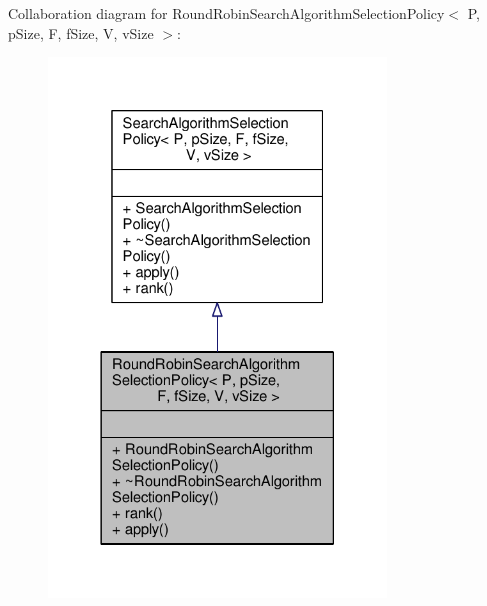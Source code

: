 Collaboration diagram for Round\+Robin\+Search\+Algorithm\+Selection\+Policy$<$ P, p\+Size, F, f\+Size, V, v\+Size $>$\+:
\nopagebreak
\begin{figure}[H]
\begin{center}
\leavevmode
\includegraphics[width=254pt]{classRoundRobinSearchAlgorithmSelectionPolicy__coll__graph}
\end{center}
\end{figure}
